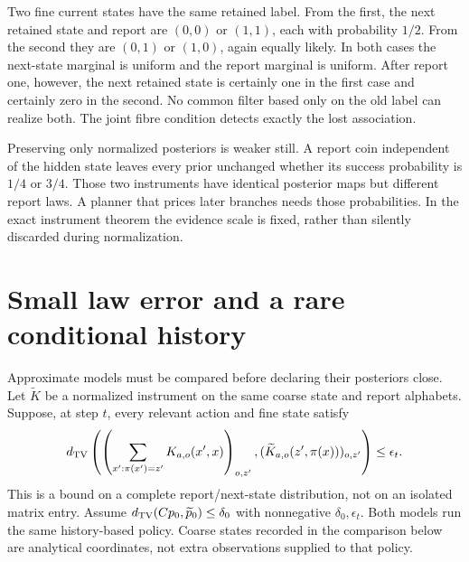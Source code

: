 \begin{Corecounterexample}\label{Core:ce:joint-marginals}
Two fine current states have the same retained label. From the first, the next retained state and report are $(0,0)$ or $(1,1)$, each with probability $1/2$. From the second they are $(0,1)$ or $(1,0)$, again equally likely. In both cases the next-state marginal is uniform and the report marginal is uniform. After report one, however, the next retained state is certainly one in the first case and certainly zero in the second. No common filter based only on the old label can realize both. The joint fibre condition detects exactly the lost association.
\end{Corecounterexample}

Preserving only normalized posteriors is weaker still. A report coin independent of the hidden state leaves every prior unchanged whether its success probability is $1/4$ or $3/4$. Those two instruments have identical posterior maps but different report laws. A planner that prices later branches needs those probabilities. In the exact instrument theorem the evidence scale is fixed, rather than silently discarded during normalization.

\section{Small law error and a rare conditional history}
Approximate models must be compared before declaring their posteriors close. Let $\widetilde K$ be a normalized instrument on the same coarse state and report alphabets. Suppose, at step $t$, every relevant action and fine state satisfy
\[
 d_{\mathrm{TV}}\left(\left(\sum_{x':\pi(x')=z'}K_{a,o}(x',x)\right)_{o,z'},
             (\widetilde K_{a,o}(z',\pi(x)))_{o,z'}\right)\le\epsilon_t.
\]
This is a bound on a complete report/next-state distribution, not on an isolated matrix entry. Assume $d_{\mathrm{TV}}(Cp_0,\widetilde p_0)\le\delta_0$ with nonnegative $\delta_0,\epsilon_t$. Both models run the same history-based policy. Coarse states recorded in the comparison below are analytical coordinates, not extra observations supplied to that policy.

